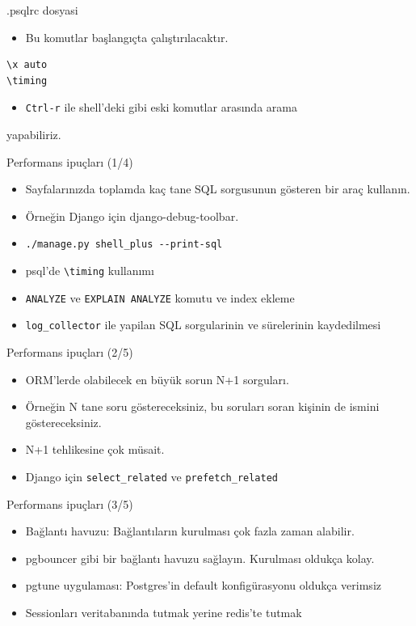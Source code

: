 \documentclass[presentation]{beamer}
\begin{document}
\begin{frame}[fragile,label=sec-11]{.psqlrc dosyasi}
 \begin{itemize}
\item Bu komutlar başlangıçta çalıştırılacaktır.
\end{itemize}

\begin{verbatim}
\x auto
\timing
\end{verbatim}

\begin{itemize}
\item \texttt{Ctrl-r} ile shell'deki gibi eski komutlar arasında arama
\end{itemize}
yapabiliriz.
\end{frame}

\begin{frame}[fragile,label=sec-12]{Performans ipuçları (1/4)}
 \begin{itemize}
\item Sayfalarınızda toplamda kaç tane SQL sorgusunun gösteren bir araç kullanın.
\item Örneğin Django için django-debug-toolbar.
\item \texttt{./manage.py shell\_plus -{}-print-sql}
\item psql'de \texttt{\textbackslash{}timing} kullanımı
\item \texttt{ANALYZE} ve \texttt{EXPLAIN ANALYZE} komutu ve index ekleme
\item \texttt{log\_collector} ile yapilan SQL sorgularinin ve sürelerinin kaydedilmesi
\end{itemize}
\end{frame}

\begin{frame}[fragile,label=sec-13]{Performans ipuçları (2/5)}
 \begin{itemize}
\item ORM'lerde olabilecek en büyük sorun N+1 sorguları.
\item Örneğin N tane soru göstereceksiniz, bu soruları soran kişinin de ismini
göstereceksiniz.
\item N+1 tehlikesine çok müsait.
\item Django için \texttt{select\_related} ve \texttt{prefetch\_related}
\end{itemize}
\end{frame}

\begin{frame}[label=sec-14]{Performans ipuçları (3/5)}
\begin{itemize}
\item Bağlantı havuzu: Bağlantıların kurulması çok fazla zaman alabilir.
\item pgbouncer gibi bir bağlantı havuzu sağlayın. Kurulması oldukça kolay.
\item pgtune uygulaması: Postgres'in default konfigürasyonu oldukça verimsiz
\item Sessionları veritabanında tutmak yerine redis'te tutmak
\end{itemize}
\end{frame}
\end{document}
